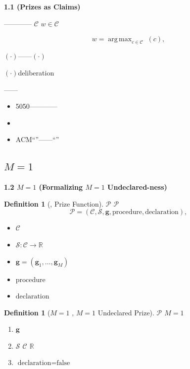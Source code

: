 \documentclass[12pt,a4paper]{article}
\newtheorem{definition}[theorem]{Definition}
\theoremstyle{remark}
\newcommand{\R}{\mathbb{R}}
\newcommand{\gaugeVec}{\mathbf{g}}
\newcommand{\scoreOp}{\mathcal{S}}
\newcommand{\prizeSet}{\mathcal{P}}
\newcommand{\candidateSet}{\mathcal{C}}
\DeclareMathOperator{\argmax}{arg\,max}
\newenvironment{honestbox}{%
    \medskip\noindent
    \color{red}
    \begin{minipage}{0.92\textwidth}
    \textbf{}
    \begin{itemize}[leftmargin=*]
}{%
    \end{itemize}
    \end{minipage}
    \medskip
}
\begin{document}
\subsection{}

\noindent
\textbf{1.1  (Prizes as Claims)}

————\textbf{} $\candidateSet$  $w \in \candidateSet$ 

\begin{equation}
    w = \argmax_{c \in \candidateSet} \; \text{}(c),
    \label{eq:prize_claim}
\end{equation}

$(\cdot)$——\textbf{$(\cdot)$}

$(\cdot)$deliberation\textit{}

——\textbf{}

\begin{honestbox}
    \item 5050————\textit{}
    \item 
    \item ACM``''——``''
\end{honestbox}

\subsection{$M=1$ }

\noindent
\textbf{1.2 $M=1$  (Formalizing $M=1$ Undeclared-ness)}

\begin{definition}[, Prize Function]
\label{def:prize_function}
 $\prizeSet$ $\prizeSet$ 
\begin{equation}
    \prizeSet = (\candidateSet, \scoreOp, \gaugeVec, \text{procedure}, \text{declaration}),
    \label{eq:prize_quintuple}
\end{equation}

\begin{itemize}
    \item $\candidateSet$
    \item $\scoreOp: \candidateSet \to \R$
    \item $\gaugeVec = (\mathbf{g}_1, \dots, \mathbf{g}_M)$
    \item $\text{procedure}$
    \item $\text{declaration}$
\end{itemize}
\end{definition}

\begin{definition}[$M=1$ , $M=1$ Undeclared Prize]
\label{def:M1_undeclared}
 $\prizeSet$  \textbf{$M=1$ }
\begin{enumerate}[label=(\roman*)]
    \item $\gaugeVec$ 
    \item $\scoreOp$  $\candidateSet$  $\R$ 
    \item $\text{declaration} = \text{false}$
\end{enumerate}
\end{definition}
\end{document}
